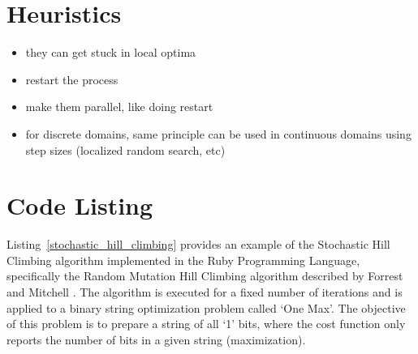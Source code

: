 \documentclass[a4paper, 11pt]{article}
\begin{document}
\section{Heuristics}
\label{sec:heuristics}
\begin{itemize}
	\item they can get stuck in local optima
	\item restart the process
	\item make them parallel, like doing restart
	\item for discrete domains, same principle can be used in continuous domains using step sizes (localized random search, etc)
\end{itemize}

\section{Code Listing}
\label{sec:code}
Listing~\ref{stochastic_hill_climbing} provides an example of the Stochastic Hill Climbing algorithm implemented in the Ruby Programming Language, specifically the Random Mutation Hill Climbing algorithm described by Forrest and Mitchell \cite{Forrest1993}.
The algorithm is executed for a fixed number of iterations and is applied to a binary string optimization problem called `One Max'. The objective of this problem is to prepare a string of all `1' bits, where the cost function only reports the number of bits in a given string (maximization).

\end{document}
